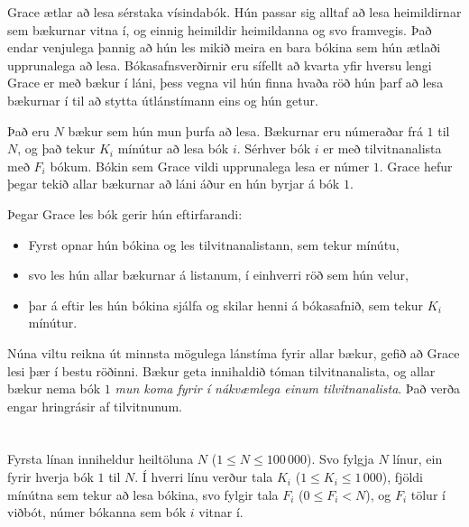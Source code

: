 \ifx\boi\undefined\fi
\def\version{jury-1}

Grace ætlar að lesa sérstaka vísindabók.
Hún passar sig alltaf að lesa heimildirnar sem bækurnar vitna í, og einnig
heimildir heimildanna og svo framvegis.
Það endar venjulega þannig að hún les mikið meira en bara bókina sem hún ætlaði upprunalega að lesa.
Bókasafnsverðirnir eru sífellt að kvarta yfir hversu lengi Grace er með bækur í láni,
þess vegna vil hún finna hvaða röð hún þarf að lesa bækurnar í til að stytta útlánstímann eins og hún getur.

Það eru $N$ bækur sem hún mun þurfa að lesa.
Bækurnar eru númeraðar frá $1$ til $N$, og það tekur $K_i$ mínútur að lesa bók $i$.
Sérhver bók $i$ er með tilvitnanalista með $F_i$ bókum.
Bókin sem Grace vildi upprunalega lesa er númer $1$.
Grace hefur þegar tekið allar bækurnar að láni áður en hún byrjar á bók $1$.

Þegar Grace les bók gerir hún eftirfarandi:

\begin{itemize}
\item Fyrst opnar hún bókina og les tilvitnanalistann, sem tekur mínútu,
\item svo les hún allar bækurnar á listanum, í einhverri röð sem hún velur,
\item þar á eftir les hún bókina sjálfa og skilar henni á bókasafnið, sem tekur $K_i$ mínútur.
\end{itemize}

Núna viltu reikna út minnsta mögulega lánstíma fyrir allar bækur, gefið að Grace lesi þær í bestu röðinni.
Bækur geta innihaldið tóman tilvitnanalista, og allar bækur nema bók $1$ {\em mun koma fyrir í nákvæmlega einum tilvitnanalista}.
Það verða engar hringrásir af tilvitnunum.

\section*{}
Fyrsta línan inniheldur heiltöluna $N$ ($1 \le N \le 100\,000$).
Svo fylgja $N$ línur, ein fyrir hverja bók $1$ til $N$.
Í hverri línu verður tala $K_i$ ($1 \le K_i \le 1\,000$), fjöldi mínútna sem tekur að lesa bókina,
svo fylgir tala $F_i$ ($0 \le F_i < N$), og $F_i$ tölur í viðbót, númer bókanna sem bók $i$ vitnar í. 

